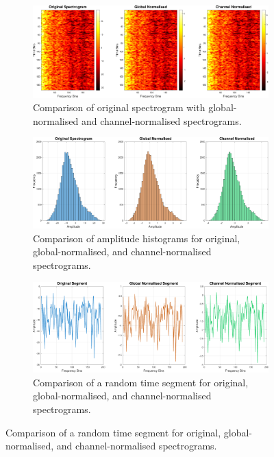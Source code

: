 \begin{figure}[p]
    \centering
    \begin{subfigure}[t]{\textwidth}
        \centering
        \includegraphics[width=\textwidth]{img/ch4/normalisation/spectrogramComparison.pdf}
        \caption{Comparison of original spectrogram with global-normalised and channel-normalised spectrograms.}
        \label{fig:normalisation-spectrogram}
    \end{subfigure}
    
    \vspace{1cm}
    
    \begin{subfigure}[t]{\textwidth}
        \centering
        \includegraphics[width=\textwidth]{img/ch4/normalisation/histogramComparison.pdf}
        \caption{Comparison of amplitude histograms for original, global-normalised, and channel-normalised spectrograms.}
        \label{fig:normalisation-histogram}
    \end{subfigure}
    
    \vspace{1cm}
    
    \begin{subfigure}[t]{\textwidth}
        \centering
        \includegraphics[width=\textwidth]{img/ch4/normalisation/timeSegmentComparison.pdf}
        \caption{Comparison of a random time segment for original, global-normalised, and channel-normalised spectrograms.}
        \label{fig:normalisation-time-segment}
    \end{subfigure}


\end{figure}
